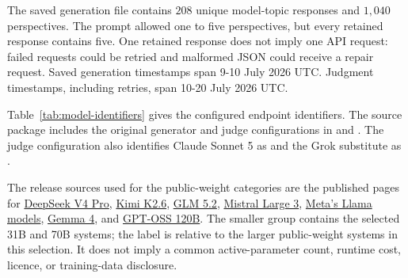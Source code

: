 \documentclass[11pt,a4paper]{article}
\begin{document}
The saved generation file contains $208$ unique model-topic responses and $1{,}040$ perspectives. The prompt allowed one to five perspectives, but every retained response contains five. One retained response does not imply one API request: failed requests could be retried and malformed JSON could receive a repair request. Saved generation timestamps span 9-10 July 2026 UTC. Judgment timestamps, including retries, span 10-20 July 2026 UTC.

Table~\ref{tab:model-identifiers} gives the configured endpoint identifiers. The source package includes the original generator and judge configurations in  and . The judge configuration also identifies Claude Sonnet 5 as  and the Grok substitute as .



The release sources used for the public-weight categories are the published pages for \href{https://huggingface.co/deepseek-ai/DeepSeek-V4-Pro}{DeepSeek V4 Pro}, \href{https://huggingface.co/moonshotai/Kimi-K2.6}{Kimi K2.6}, \href{https://huggingface.co/zai-org/GLM-5.2}{GLM 5.2}, \href{https://huggingface.co/collections/mistralai/mistral-large-3}{Mistral Large 3}, \href{https://ai.meta.com/llama/get-started/}{Meta's Llama models}, \href{https://blog.google/innovation-and-ai/technology/developers-tools/gemma-4/}{Gemma 4}, and \href{https://huggingface.co/openai/gpt-oss-120b}{GPT-OSS 120B}. The smaller group contains the selected 31B and 70B systems; the label is relative to the larger public-weight systems in this selection. It does not imply a common active-parameter count, runtime cost, licence, or training-data disclosure.
\end{document}
